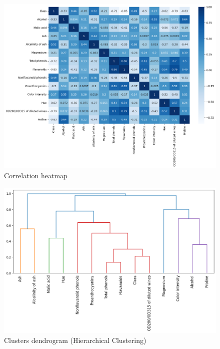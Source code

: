 \documentclass[twocolumn]{article}
\begin{document}
	\begin{figure}[H]
		\centering
		\includegraphics[width=1\linewidth]{Correlation.png}
		\caption{Correlation heatmap}
		\label{fig:correlation-heatmap}
	\end{figure}

	\begin{figure}[H]
		\centering
		\includegraphics[width=1\linewidth]{Cluster Hierarchy.png}
		\caption{Clusters dendrogram (Hierarchical Clustering)}
		\label{fig:cluster-dendrogram}
	\end{figure}
\end{document}
